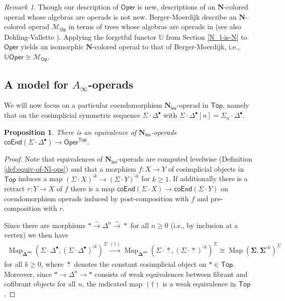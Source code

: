 \documentclass[11pt]{amsart}
\newtheorem{proposition}[subsection]{Proposition}
\theoremstyle{definition}
\theoremstyle{remark}
\newtheorem{remark}[subsection]{Remark}
\newcommand{\Oper}{\mathsf{Oper}}
\newcommand{\Map}{\operatorname{Map}}
\newcommand{\pt}{*}
\newcommand{\Cal}[1]{\mathcal{#1}}
\newcommand{\boxcirc}{\mathring{\square}}
\newcommand{\Nl}{\mathbf{N}_{\mathsf{lev}}}
\newcommand{\SD}{\Sigma{\cdot}\Delta^{\bullet}}
\newcommand{\bdel}{\mathbf{\Delta}}
\newcommand{\Dres}{\bdel^{\mathsf{res}}}
\begin{document}
\begin{remark}
 \label{trees-rmk}
    Though our description of $\Oper$ is new, descriptions of an $\mathbf{N}$-colored operad whose algebras are operads is not new. Berger-Moerdijk describe an $\mathbf{N}$-colored operad $\Cal{M}_{\textsf{Op}}$ in terms of trees whose algebras are operads in \cite[1.5.6]{BM-trees} (see also Dehling-Vallette \cite{Deh-Val}). Applying the forgetful functor $\mathbb{U}$ from Section \ref{N_l-is-N} to $\Oper$ yields an isomorphic $\mathbf{N}$-colored operad to that of Berger-Moerdijk, i.e., $\mathbb{U}\Oper\cong \Cal{M}_{\mathsf{Op}}$.
\end{remark}

\subsection{A model for $A_{\infty}$-operads} \label{sec:A}
We will now focus on a particular coendomorphism $\Nl$-operad in $\mathsf{Top}$, namely that on the cosimplicial symmetric sequence $\SD$ with $\SD[n]=\Sigma_n {\cdot} \Delta^{\bullet}$. 

\begin{proposition}\label{A-equiv-to-E} 
There is an equivalence of $\Nl$-operads $\mathsf{coEnd}(\SD) \to \Oper^{\mathsf{Top}}$. %
\end{proposition}

\begin{proof} Note that equivalences of $\Nl$-operads are computed levelwise (Definition \ref{def:equiv-of-Nl-ops}) and that a morphism $f\colon X\to Y$ of cosimplicial objects in $\mathsf{Top}$ induces a map $(\Sigma {\cdot} X)^{\boxcirc k}\to (\Sigma {\cdot} Y)^{\boxcirc k}$ for $k\geq 1$. If additionally there is a retract $r\colon Y\to X$ of $f$ there is a map $\mathsf{coEnd}(\Sigma {\cdot} X)\to \mathsf{coEnd}(\Sigma{\cdot} Y)$ on coendomorphism operads induced by post-composition with $f$ and pre-composition with $r$.

Since there are morphisms $\pt \xrightarrow{\sim}\Delta^n\xrightarrow{\sim} \pt$ for all $n \geq 0$ (i.e., by inclusion at a vertex) we then have  \begin{align*}
    \Map_{\Dres}\left(\SD,(\SD)^{\boxcirc k}\right)^{\Sigma}
    \xrightarrow{(\dagger)}\Map_{\Dres}\left(\Sigma{\cdot}\underline{\pt}, (\Sigma{\cdot}\underline{\pt})^{\boxcirc k}\right)^{\Sigma}\cong \Map\left(\mathbf{\Sigma}, \mathbf{\Sigma}^{\circ k}\right)^{\Sigma}
\end{align*}
for all $k \geq 0$, where $\underline{\pt}$ denotes the constant cosimplicial object on $\pt\in \mathsf{Top}$. Moreover, since $\pt \to \Delta^n\to \pt$ consists of weak equivalences between fibrant and cofibrant objects for all $n$, the indicated map $(\dagger)$ is a weak equivalence in $\mathsf{Top}$.
\end{proof}
\end{document}
